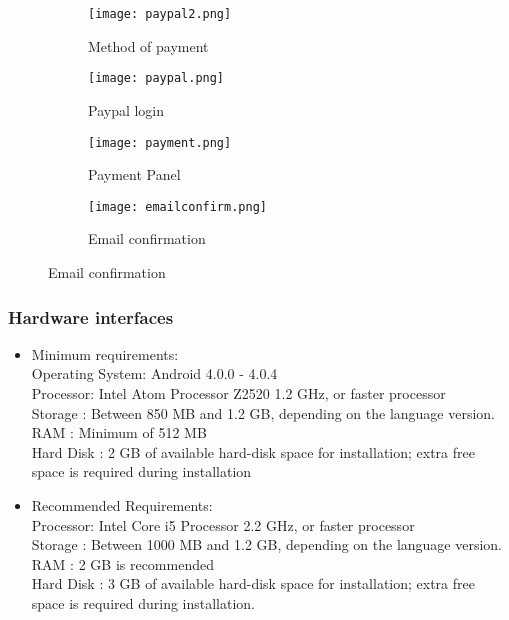 \documentclass[12pt]{article}
\begin{document}
\begin{figure}[h!]
	\centering
	\begin{subfigure}[b]{0.3\linewidth}
		\texttt{[image: paypal2.png]}
		\caption{Method of payment}
		\vspace{1cm}
		\hspace{2cm}
	\end{subfigure}
	\begin{subfigure}[b]{0.3\linewidth}
		\texttt{[image: paypal.png]}
		\caption{Paypal login}
		\vspace{1cm}
		\hspace{2cm}
	\end{subfigure}
	\begin{subfigure}[b]{0.3\linewidth}
		\texttt{[image: payment.png]}
		\caption{Payment Panel}
		\vspace{1cm}
		\hspace{2cm}
	\end{subfigure}
		\begin{subfigure}[b]{0.3\linewidth}
		\texttt{[image: emailconfirm.png]}
		\caption{Email confirmation}
		\vspace{1cm}
		\hspace{2cm}
	\end{subfigure}
	
\end{figure}
\newpage
\subsubsection{Hardware interfaces}
 \begin{itemize}
	\item Minimum requirements: \\
	Operating System: Android 4.0.0 - 4.0.4 \\
	Processor: Intel Atom Processor Z2520 1.2 GHz, or faster processor \\
	Storage : Between 850 MB and 1.2 GB, depending on the language version.\\
	RAM : Minimum of 512 MB\\
	Hard Disk : 2 GB of available hard-disk space for installation; extra free space is required during installation 

	\item Recommended Requirements: \\
	Processor: Intel Core i5 Processor 2.2 GHz, or faster processor \\
	Storage : Between 1000 MB and 1.2 GB, depending on the language version.\\
	RAM : 2 GB is recommended\\
	Hard Disk : 3 GB of available hard-disk space for installation; extra free space is required during installation. 
 \end{itemize}
\end{document}

